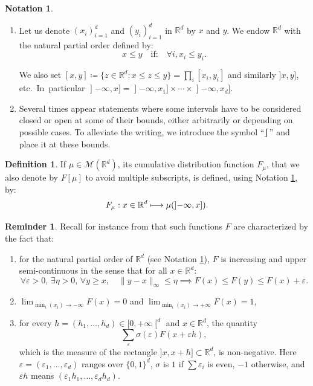 \documentclass[10pt,a4paper]{article}
\newcommand\mto{\mathchoice{\longmapsto}{\mapsto}{\mapsto}{\mapsto}}
\theoremstyle{plain}
\theoremstyle{definition}
\newtheorem{defi}[them]{Definition}
\newtheorem{notation}[them]{Notation} %
\newtheorem{reminder}[them]{Reminder}
\newcommand{\eqdef}{\coloneqq}
\let\eps\varepsilon
\newcommand{\m}{\mathcal{M}}
\newcommand{\R}{\mathbb{R}}
\newcommand{\op}{\mathopen}
\newcommand{\clo}{\mathclose}
\newcommand{\rsemibracket}{\mathclose{\rfloor\hspace*{-.9ex}\lceil}}
\begin{document}
\begin{notation}\label{notation:intervallesRd}
\begin{enumerate}
\item
 Let us denote $(x_i)_{i=1}^d$ and $(y_i)_{i=1}^d$ in $\R^d$ by $x$ and $y$. We endow $\R^d$ with the natural partial order defined by:
\[x\leqslant y\quad \text{if:}\quad\forall i,x_i\leqslant y_i.\]

We also set $[x,y]\eqdef\{z\in\R^d:x\leqslant z\leqslant y\}=\prod_i[x_i,y_i]$ and similarly $]x,y]$, etc.\ In~particular $\op]-\infty,x]=\op]-\infty,x_1]\times\cdots\times\op]-\infty,x_d]$.

\item
Several times appear statements where some intervals have to be considered closed or open at some of their bounds, either arbitrarily or depending on possible cases. To alleviate the writing, we introduce the symbol ``$\rsemibracket$'' and place it at these bounds.
\end{enumerate}
\end{notation}

\begin{defi}\label{def:cumul}
If $\mu\in\m(\R^d)$, its cumulative distribution function $F_\mu$, that we also denote by $F[\mu]$ to avoid multiple subscripts, is defined, using Notation \ref{notation:intervallesRd}, by:
\[F_\mu:x\in\R^d\mto\mu(\op]-\infty,x]).\]
\end{defi}

\begin{reminder}\label{remind:F}
Recall for instance from \cite[Th.\,3.25]{Kal} that such functions $F$ are characterized by the fact that:
\begin{enumerate}
\item
\label{item:Fonctions_partielles} for the natural partial order of $\R^d$ (see Notation \ref{notation:intervallesRd}), $F$ is increasing and upper semi-continuous in the sense that for all $x\in\R^d$:
\begin{equation}\label{eq:usc}
\forall\varepsilon>0,\,\exists\eta>0,\,\forall y\geqslant x,\quad \|y-x\|_\infty\leqslant\eta\implies F(x)\leqslant F(y)\leqslant F(x)+\varepsilon.
\end{equation}

\item
\label{item:Flimite} $\lim_{\min_i(x_i)\to-\infty} F(x)=0$ and $\lim_{\min_i(x_i)\to+\infty} F(x)=1$,

\item
\label{item:Fdifferences_croisees} for every $h=(h_1,\ldots,h_d)\in[0,+\infty\clo[^d$ and $x
\in \R^d$, the quantity
\[
\sum_{\eps} \sigma(\eps) F(x+\eps h),
\]
which is the measure of the rectangle $]x,x+h]\subset \R^d$, is non-negative. Here $\eps=(\eps_1,\ldots,\eps_d)$ ranges over $\{0,1\}^d$, $\sigma$ is $1$ if $\sum \eps_i$ is even, $-1$ otherwise, and $\eps h$ means $(\eps_1h_1,\ldots,\eps_dh_d)$.
\end{enumerate}
\end{reminder}
\end{document}
